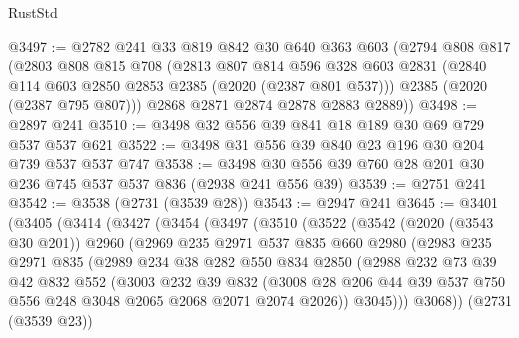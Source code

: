 \begin{lexlean}{RustStd}
\begin{coremodule}
@3497 := @2782
    @241
    @33
    @819
    @842
    @30
    @640
    @363
    @603
    (@2794
      @808
      @817
      (@2803
        @808
        @815
        @708
        (@2813
          @807
          @814
          @596
          @328
          @603
          @2831
          (@2840 @114 @603 @2850 @2853 @2385 (@2020 (@2387 @801 @537)))
          @2385
          (@2020 (@2387 @795 @807)))
        @2868
        @2871
        @2874
        @2878
        @2883
        @2889))
@3498 := @2897 @241
@3510 := @3498 @32 @556 @39 @841 @18 @189 @30 @69 @729 @537 @537 @621
@3522 := @3498 @31 @556 @39 @840 @23 @196 @30 @204 @739 @537 @537 @747
@3538 := @3498 @30 @556 @39 @760 @28 @201 @30 @236 @745 @537 @537 @836 (@2938 @241 @556 @39)
@3539 := @2751 @241
@3542 := @3538 (@2731 (@3539 @28))
@3543 := @2947 @241
@3645 := @3401
    (@3405
      (@3414
        (@3427
          (@3454
            (@3497
              (@3510
                (@3522
                  (@3542
                    (@2020 (@3543 @30 @201))
                    @2960
                    (@2969
                      @235
                      @2971
                      @537
                      @835
                      @660
                      @2980
                      (@2983
                        @235
                        @2971
                        @835
                        (@2989
                          @234
                          @38
                          @282
                          @550
                          @834
                          @2850
                          (@2988
                            @232
                            @73
                            @39
                            @42
                            @832
                            @552
                            (@3003
                              @232
                              @39
                              @832
                              (@3008
                                @28
                                @206
                                @44
                                @39
                                @537
                                @750
                                @556
                                @248
                                @3048
                                @2065
                                @2068
                                @2071
                                @2074
                                @2026))
                            @3045)))
                      @3068))
                  (@2731 (@3539 @23))

\end{coremodule}
\end{lexlean}
